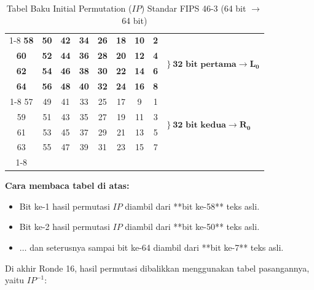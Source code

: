 \documentclass[11pt,a4paper]{article}
\begin{document}
\begin{table}[H]
\centering
\caption{Tabel Baku Initial Permutation ($IP$) Standar FIPS 46-3 (64 bit $\to$ 64 bit)}
\label{tab:ip_table}
\vspace{0.2cm}
\begin{tabular}{|cccccccc|l}
\cline{1-8}
\textbf{58} & \textbf{50} & \textbf{42} & \textbf{34} & \textbf{26} & \textbf{18} & \textbf{10} & \textbf{2} & \multirow{4}{*}{$\Big\}\ \mathbf{32\text{ bit pertama}} \to \mathbf{L_0}$} \\
\textbf{60} & \textbf{52} & \textbf{44} & \textbf{36} & \textbf{28} & \textbf{20} & \textbf{12} & \textbf{4} & \\
\textbf{62} & \textbf{54} & \textbf{46} & \textbf{38} & \textbf{30} & \textbf{22} & \textbf{14} & \textbf{6} & \\
\textbf{64} & \textbf{56} & \textbf{48} & \textbf{40} & \textbf{32} & \textbf{24} & \textbf{16} & \textbf{8} & \\
\cline{1-8}
57 & 49 & 41 & 33 & 25 & 17 & 9 & 1 & \multirow{4}{*}{$\Big\}\ \mathbf{32\text{ bit kedua}} \to \mathbf{R_0}$} \\
59 & 51 & 43 & 35 & 27 & 19 & 11 & 3 & \\
61 & 53 & 45 & 37 & 29 & 21 & 13 & 5 & \\
63 & 55 & 47 & 39 & 31 & 23 & 15 & 7 & \\
\cline{1-8}
\end{tabular}
\end{table}

\noindent
\textbf{Cara membaca tabel di atas:}
\begin{itemize}[leftmargin=*]
    \item Bit ke-1 hasil permutasi $IP$ diambil dari **bit ke-58** teks asli.
    \item Bit ke-2 hasil permutasi $IP$ diambil dari **bit ke-50** teks asli.
    \item $\dots$ dan seterusnya sampai bit ke-64 diambil dari **bit ke-7** teks asli.
\end{itemize}

Di akhir Ronde 16, hasil permutasi dibalikkan menggunakan tabel pasangannya, yaitu $IP^{-1}$:
\end{document}
